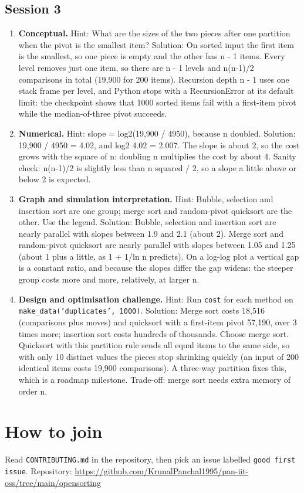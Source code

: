 \documentclass[11pt,a4paper]{article}
\begin{document}
\subsection*{Session 3}
\begin{enumerate}[nosep]
\item \textbf{Conceptual.} Hint: What are the sizes of the two pieces after one partition when the pivot is the smallest item? Solution: On sorted input the first item is the smallest, so one piece is empty and the other has n - 1 items. Every level removes just one item, so there are n - 1 levels and n(n-1)/2 comparisons in total (19,900 for 200 items). Recursion depth n - 1 uses one stack frame per level, and Python stops with a RecursionError at its default limit: the checkpoint shows that 1000 sorted items fail with a first-item pivot while the median-of-three pivot succeeds.
\item \textbf{Numerical.} Hint: slope = log2(19,900 / 4950), because n doubled. Solution: 19,900 / 4950 = 4.02, and log2 4.02 = 2.007. The slope is about 2, so the cost grows with the square of n: doubling n multiplies the cost by about 4. Sanity check: n(n-1)/2 is slightly less than n squared / 2, so a slope a little above or below 2 is expected.
\item \textbf{Graph and simulation interpretation.} Hint: Bubble, selection and insertion sort are one group; merge sort and random-pivot quicksort are the other. Use the legend. Solution: Bubble, selection and insertion sort are nearly parallel with slopes between 1.9 and 2.1 (about 2). Merge sort and random-pivot quicksort are nearly parallel with slopes between 1.05 and 1.25 (about 1 plus a little, as 1 + 1/ln n predicts). On a log-log plot a vertical gap is a constant ratio, and because the slopes differ the gap widens: the steeper group costs more and more, relatively, at larger n.
\item \textbf{Design and optimisation challenge.} Hint: Run \texttt{cost} for each method on \texttt{make\_data('duplicates', 1000)}. Solution: Merge sort costs 18,516 (comparisons plus moves) and quicksort with a first-item pivot 57,190, over 3 times more; insertion sort costs hundreds of thousands. Choose merge sort. Quicksort with this partition rule sends all equal items to the same side, so with only 10 distinct values the pieces stop shrinking quickly (an input of 200 identical items costs 19,900 comparisons). A three-way partition fixes this, which is a roadmap milestone. Trade-off: merge sort needs extra memory of order n.
\end{enumerate}

\section{How to join}
Read \texttt{CONTRIBUTING.md} in the repository, then pick an issue labelled \texttt{good first issue}. Repository: \url{https://github.com/KrunalPanchal1995/pan-iit-oss/tree/main/opensorting}
\end{document}
